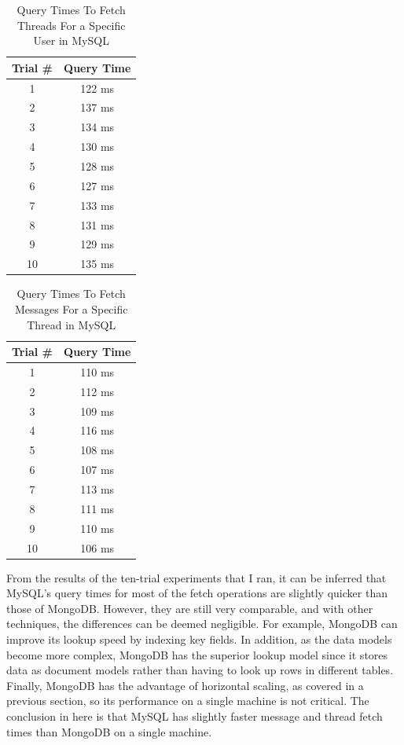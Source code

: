 \documentclass[12pt]{article}
\begin{document}
\begin{table}[h!]
\centering
\caption{Query Times To Fetch Threads For a Specific User in MySQL}
\vspace{2mm}
\begin{tabular}{|c|c|} 
 \hline
 Trial \# & Query Time \\ [0.5ex] 
 \hline\hline
 1 & 122 ms \\ 
 2 & 137 ms \\
 3 & 134 ms \\
 4 & 130 ms \\
 5 & 128 ms \\
 6 & 127 ms \\
 7 & 133 ms \\
 8 & 131 ms \\
 9 & 129 ms \\
 10 & 135 ms \\
 \hline
\end{tabular}
\end{table}

\begin{table}[h!]
\centering
\caption{Query Times To Fetch Messages For a Specific Thread in MySQL}
\vspace{2mm}
\begin{tabular}{|c|c|} 
 \hline
 Trial \# & Query Time \\ [0.5ex] 
 \hline\hline
 1 & 110 ms \\ 
 2 & 112 ms \\
 3 & 109 ms \\
 4 & 116 ms \\
 5 & 108 ms \\
 6 & 107 ms \\
 7 & 113 ms \\
 8 & 111 ms \\
 9 & 110 ms \\
 10 & 106 ms \\
 \hline
\end{tabular}
\end{table}

From the results of the ten-trial experiments that I ran, it can be inferred that MySQL's query times for most of the fetch operations are slightly quicker than those of MongoDB. However, they are still very comparable, and with other techniques, the differences can be deemed negligible. For example, MongoDB can improve its lookup speed by indexing key fields. In addition, as the data models become more complex, MongoDB has the superior lookup model since it stores data as document models rather than having to look up rows in different tables. Finally, MongoDB has the advantage of horizontal scaling, as covered in a previous section, so its performance on a single machine is not critical. The conclusion in here is that MySQL has slightly faster message and thread fetch times than MongoDB on a single machine.
\end{document}

